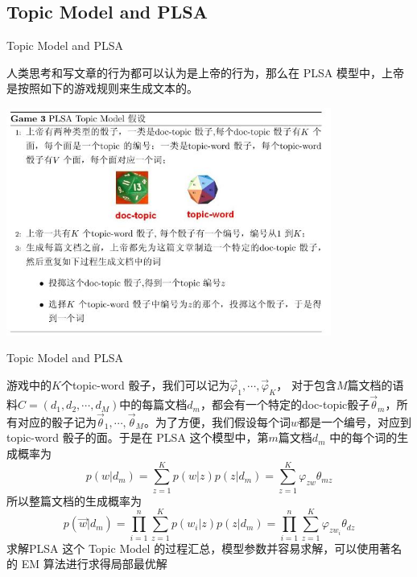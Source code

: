 \documentclass{beamer}
\begin{document}
\begin{CJK*}{UTF8}{gbsn}
\subsection{Topic Model and PLSA}
\begin{frame}{Topic Model and PLSA}

人类思考和写文章的行为都可以认为是上帝的行为，那么在 PLSA 模型中，上帝是按照如下的游戏规则来生成文本的。
\begin{center}
      \includegraphics[width=0.8\textwidth]{picture/gm3.jpeg}
\end{center} 
\end{frame}

\begin{frame}{Topic Model and PLSA}
\begin{small}
游戏中的$K$个topic-word 骰子，我们可以记为$\overrightarrow{\varphi}_1, \cdots, \overrightarrow{\varphi}_K$， 对于包含$M$篇文档的语料$C=(d_1, d_2, \cdots, d_M)$中的每篇文档$d_m$，都会有一个特定的doc-topic骰子$\overrightarrow{\theta}_m$，所有对应的骰子记为$\overrightarrow{\theta}_1, \cdots,\overrightarrow{\theta}_M$。为了方便，我们假设每个词$w$都是一个编号，对应到topic-word 骰子的面。于是在 PLSA 这个模型中，第$m$篇文档$d_m$
中的每个词的生成概率为$$ p(w|d_m) = \sum_{z=1}^K p(w|z)p(z|d_m) = \sum_{z=1}^K \varphi_{zw} \theta_{mz}$$所以整篇文档的生成概率为
$$ p(\overrightarrow{w}|d_m) = \prod_{i=1}^n \sum_{z=1}^K p(w_i|z)p(z|d_m) = \prod_{i=1}^n \sum_{z=1}^K \varphi_{zw_i} \theta_{dz} $$求解PLSA 这个 Topic Model 的过程汇总，模型参数并容易求解，可以使用著名的 EM 算法进行求得局部最优解
\end{small}
\end{frame}


\end{CJK*}
\end{document}
